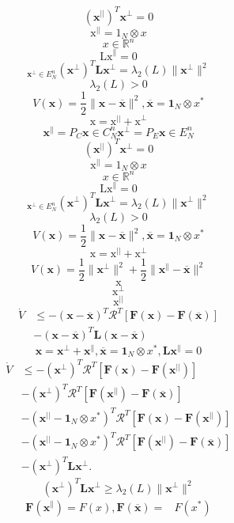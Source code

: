\documentclass[11pt]{ctexart}
\begin{document}
$$(\mathbf{x}^{||})^T\mathbf{x}^\perp=0$$
$$\mathrm{x}^{||}=1_{N}\otimes x$$
$$x\in\mathbb{R}^{n}$$
$$\mathrm{Lx}^{\parallel}=0$$
$$_{\mathbf{x}^{\perp}\in E_{N}^{n}}(\mathbf{x}^{\perp})^{T}\mathbf{L}\mathbf{x}^{\perp}=\lambda_{2}(L)\|\mathbf{x}^{\perp}\|^{2}$$
$$\lambda_{2}(L)>0$$
$$V(\mathbf{x})=\frac{1}{2}\|\mathbf{x}-\overline{\mathbf{x}}\|^{2},\overline{\mathbf{x}}=\mathbf{1}_{N}\otimes x^{*}$$
$$\mathrm{x=x^{||}+x^{\perp}}$$
$$\mathbf{x}^{\parallel}=P_C\mathbf{x}\in C_N^n\mathbf{x}^{\perp}=P_E\mathbf{x}\in E_N^n$$
$$(\mathbf{x}^{||})^T\mathbf{x}^\perp=0$$
$$\mathrm{x}^{||}=1_{N}\otimes x$$
$$x\in\mathbb{R}^{n}$$
$$\mathrm{Lx}^{\parallel}=0$$
$$_{\mathbf{x}^{\perp}\in E_{N}^{n}}(\mathbf{x}^{\perp})^{T}\mathbf{L}\mathbf{x}^{\perp}=\lambda_{2}(L)\|\mathbf{x}^{\perp}\|^{2}$$
$$\lambda_{2}(L)>0$$
$$V(\mathbf{x})=\frac{1}{2}\|\mathbf{x}-\overline{\mathbf{x}}\|^{2},\overline{\mathbf{x}}=\mathbf{1}_{N}\otimes x^{*}$$
$$\mathrm{x=x^{||}+x^{\perp}}$$
$$V(\mathbf{x})=\frac12\|\mathbf{x}^{\perp}\|^{2}+\frac12\|\mathbf{x}^{\parallel}-\overline{\mathbf{x}}\|^{2}$$
$$\mathrm{x}$$
$$\mathrm{x}^{\perp}$$
$$\mathrm{x}^{||}$$
$$\begin{aligned}
	\dot{V}& \leq-(\mathbf{x}-\overline{\mathbf{x}})^T\mathcal{R}^T[\mathbf{F}(\mathbf{x})-\mathbf{F}(\overline{\mathbf{x}})]  \\
	&-\left(\mathbf{x}-\overline{\mathbf{x}}\right)^T\mathbf{L}(\mathbf{x}-\overline{\mathbf{x}})
\end{aligned}$$
$$\mathbf{x}=\mathbf{x}^\perp+\mathbf{x}^\parallel,\overline{\mathbf{x}}=\mathbf{1}_N\otimes x^*,\mathbf{L}\mathbf{x}^\parallel=0$$
$$\begin{aligned}
	\dot{V}& \leq-(\mathbf{x}^\perp)^T\mathcal{R}^T\left[\mathbf{F}(\mathbf{x})-\mathbf{F}(\mathbf{x}^{||})\right]  \\
	&-(\mathbf{x}^\perp)^T\mathcal{R}^T\left[\mathbf{F}(\mathbf{x}^{||})-\mathbf{F}(\overline{\mathbf{x}})\right] \\
	&-\left(\mathbf{x}^{||}-\mathbf{1}_N\otimes x^*\right)^T\mathcal{R}^T\left[\mathbf{F}(\mathbf{x})-\mathbf{F}(\mathbf{x}^{||})\right] \\
	&-(\mathbf{x}^{||}-\mathbf{1}_N\otimes x^*)^T\mathcal{R}^T\left[\mathbf{F}(\mathbf{x}^{||})-\mathbf{F}(\overline{\mathbf{x}})\right] \\
	&-\left(\mathbf{x}^{\perp}\right)^T\mathbf{L}\mathbf{x}^{\perp}.
\end{aligned}$$
$$(\mathbf{x}^\perp)^T\mathbf{L}\mathbf{x}^\perp\geq\lambda_2(L)\|\mathbf{x}^\perp\|^2$$
$$\begin{aligned}\mathbf{F}(\mathbf{x}^{\parallel})=F(x),\mathbf{F}(\overline{\mathbf{x}})=&F(x^*)\end{aligned}$$
\end{document}
